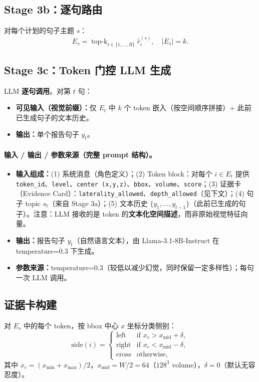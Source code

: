 \documentclass[11pt,a4paper]{article}
\theoremstyle{definition}
\begin{document}
\subsection{Stage 3b：逐句路由}

对每个计划的句子主题 $s$：
\begin{equation}
E_s = \operatorname{top\text{-}k}_{i \in \{1,\ldots,B\}} \hat{r}_i^{(s)}, \quad |E_s| = k.
\end{equation}

\subsection{Stage 3c：Token 门控 LLM 生成}

LLM \textbf{逐句调用}。对第 $t$ 句：
\begin{itemize}
    \item \textbf{可见输入（视觉前缀）：}仅 $E_t$ 中 $k$ 个 token 嵌入（按空间顺序拼接）+ 此前已生成句子的文本历史。
    \item \textbf{输出：}单个报告句子 $y_t$。
\end{itemize}

\paragraph{输入 / 输出 / 参数来源（完整 prompt 结构）。}
\begin{itemize}[nosep]
    \item \textbf{输入组成：}(1) 系统消息（角色定义）；(2) Token block：对每个 $i \in E_t$ 提供 \texttt{token\_id}、\texttt{level}、\texttt{center (x,y,z)}、\texttt{bbox}、\texttt{volume}、\texttt{score}；(3) 证据卡（Evidence Card）：\texttt{laterality\_allowed}、\texttt{depth\_allowed}（见下文）；(4) 句子 topic $s_t$（来自 Stage 3a）；(5) 文本历史 $\{y_1, \ldots, y_{t-1}\}$（此前已生成的句子）。注意：LLM 接收的是 token 的\textbf{文本化空间描述}，而非原始视觉特征向量。
    \item \textbf{输出：}报告句子 $y_t$（自然语言文本），由 Llama-3.1-8B-Instruct 在 temperature=0.3 下生成。
    \item \textbf{参数来源：}temperature=0.3（较低以减少幻觉，同时保留一定多样性）；每句一次 LLM 调用。
\end{itemize}

\subsection{证据卡构建}

对 $E_s$ 中的每个 token，按 bbox 中心 $x$ 坐标分类侧别：
\begin{equation}
\mathrm{side}(i) = \begin{cases}
    \text{left}  & \text{if } x_c > x_{\mathrm{mid}} + \delta, \\
    \text{right} & \text{if } x_c < x_{\mathrm{mid}} - \delta, \\
    \text{cross} & \text{otherwise},
\end{cases}
\end{equation}
其中 $x_c = (x_{\min} + x_{\max})/2$，$x_{\mathrm{mid}} = W/2 = 64$（$128^3$ volume），$\delta = 0$（默认无容忍度）。
\end{document}
